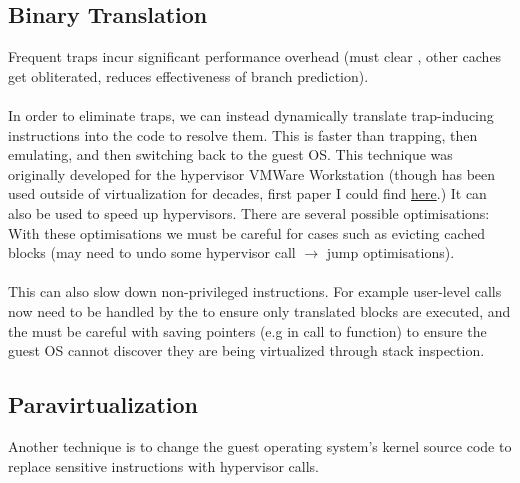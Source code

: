 \documentclass{report}
\begin{document}
\subsection*{Binary Translation}
Frequent traps incur significant performance overhead (must clear , other caches get obliterated, reduces effectiveness of branch prediction).
\\
\\ In order to eliminate traps, we can instead dynamically translate trap-inducing instructions into the code to resolve them. This is faster than trapping, then emulating, and then switching back to the guest OS.
This technique was originally developed for the  hypervisor VMWare Workstation (though has been used outside of virtualization for decades, first paper I could find \href{https://dl.acm.org/doi/10.1145/151220.151227}{here}.) It can also be used to speed up  hypervisors.
There are several possible optimisations:
With these optimisations we must be careful for cases such as evicting cached blocks (may need to undo some hypervisor call $\to$ jump optimisations).
\\
\\ This can also slow down non-privileged instructions. For example user-level calls now need to be handled by the  to ensure only translated blocks are executed, and the  must be careful with saving pointers (e.g in call to  function) to ensure the guest OS cannot discover they are being virtualized through stack inspection.
\subsection*{Paravirtualization}
Another technique is to change the guest operating system's kernel source code to replace sensitive instructions with hypervisor calls.
\end{document}
